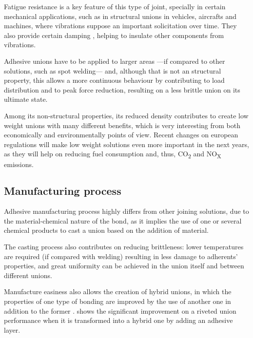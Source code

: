 \documentclass[
documentsize = a4, %
font = cmr, %
typesize = 11, %
printmode = true,
onehalfspacing = true,
language = en, %
titlepage = udciccp, %
degree = pt, %
dedication = true,
acknowledgements = true,
abstract-en = true,
abstract-es = false,
abstract-ga = false,
epigraphs = true,
toc = true,
lof = true,
lot = true,
frontmatterintoc = false,
notation = false,
minimal = false,
]{UDCthesis}
\begin{document}

Fatigue resistance is a key feature of this type of joint, specially in certain mechanical applications, such as in structural unions in vehicles, aircrafts and machines, where vibrations suppose an important solicitation over time. They also provide certain damping \citep{Loureiro2010}, helping to insulate other components from vibrations.

Adhesive unions have to be applied to larger areas ---if compared to other solutions, such as spot welding--- and, although that is not an structural property, this allows a more continuous behaviour \citep{Vaidya2006, Liao2011} by contributing to load distribution and to peak force reduction, resulting on a less brittle union on its ultimate state.

Among its non-structural properties, its reduced density contributes to create low weight unions with many different benefits, which is very interesting from both economically and environmentally points of view. Recent changes on european regulations will make low weight solutions even more important in the next years, as they will help on reducing fuel consumption and, thus, CO\textsubscript{2} and NO\textsubscript{X} emissions.

\subsection{Manufacturing process}

Adhesive manufacturing process highly differs from other joining solutions, due to the material-chemical nature of the bond, as it implies the use of one or several chemical products to cast a union based on the addition of material.

The casting process also contributes on reducing brittleness: lower temperatures are required (if compared with welding) resulting in less damage to adherents’ properties, and great uniformity can be achieved in the union itself and between different unions.

Manufacture easiness also allows the creation of hybrid unions, in which the properties of one type of bonding are improved by the use of another one in addition to the former \citep{Sadowski2010, Sadowski2011}.  shows the significant improvement on a riveted union performance when it is transformed into a hybrid one by adding an adhesive layer.
\end{document}
